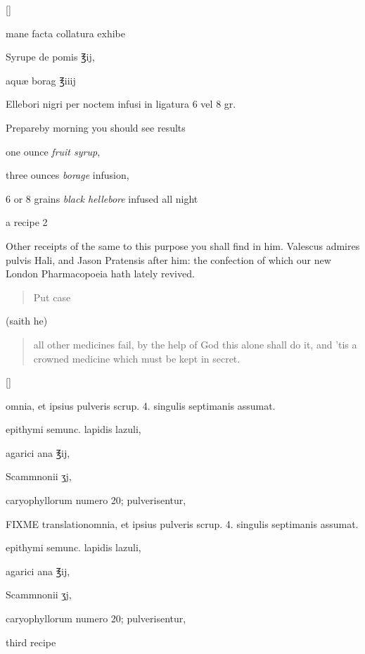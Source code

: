 \vspace{-\baselineskip}
\begin{Prescription}[H]
[\baselineskip]
\begin{prescriptionbox}{}{\textlatin{mane facta collatura exhibe}}
\item \textlatin{Syrupe de pomis} ℥ij,
\item \textlatin{aqu\ae{} borag ℥iiij}
\item \textlatin{Ellebori nigri per noctem infusi in ligatura 6 vel 8 gr.}
\end{prescriptionbox}
\begin{prescriptionbox}{Prepare}{by morning you should see results}
\item one ounce \emph{fruit syrup},
\item three ounces \emph{borage} infusion,
\item 6 or 8 grains \emph{black hellebore} infused all night
\end{prescriptionbox}
\caption{a recipe 2}
\end{Prescription}

Other receipts of the same to this purpose you shall find in him. Valescus admires pulvis Hali, and Jason Pratensis after him: the confection of which our new London Pharmacopoeia hath lately revived. \blockquote{Put case} (saith he) \blockquote{all other medicines fail, by the help of God this alone shall do it, and 'tis a crowned medicine which must be kept
in secret.}

\vspace{-2\baselineskip}
\begin{Prescription}[H]
[\baselineskip]
\begin{prescriptionbox}{}{\textlatin{omnia, et ipsius pulveris scrup. 4. singulis septimanis assumat.}}
\item \textlatin{epithymi semunc. lapidis lazuli},
\item \textlatin{agarici ana ℥ij},
\item \textlatin{Scammnonii ʒj},
\item \textlatin{caryophyllorum numero 20; pulverisentur},
\end{prescriptionbox}
\begin{prescriptionbox}{FIXME translation}{\textlatin{omnia, et ipsius pulveris scrup. 4. singulis septimanis assumat.}}
\item \textlatin{epithymi semunc. lapidis lazuli},
\item \textlatin{agarici ana ℥ij},
\item \textlatin{Scammnonii ʒj},
\item \textlatin{caryophyllorum numero 20; pulverisentur},
\end{prescriptionbox}
\caption{third recipe}
\end{Prescription}


